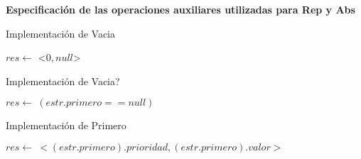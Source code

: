 \begin{Representacion}
\textbf{Especificaci\'on de las operaciones auxiliares utilizadas para Rep y Abs}

\end{Representacion}

\begin{Algoritmos}

\begin{algorithm}
\caption{Implementaci\'on de Vacia}
\begin{algorithmic}[0]
\State $res\gets $ <$0, null$> 
\EndFunction
\end{algorithmic}
\end{algorithm}


\begin{algorithm}
\caption{Implementaci\'on de Vacia?}
\begin{algorithmic}[0]
\State $res\gets \ (estr.primero == null)$ 
\EndFunction
\end{algorithmic}
\end{algorithm}

\begin{algorithm}
\caption{Implementaci\'on de Primero}
\begin{algorithmic}[0]
\State $res\gets \ <(estr.primero).prioridad, (estr.primero).valor>$ 
\EndFunction
\end{algorithmic}
\end{algorithm}




\end{Algoritmos}
